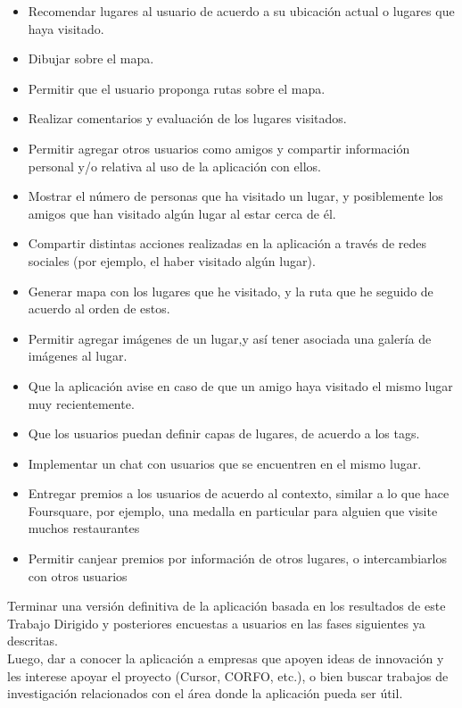 \documentclass[10pt,letterpaper]{article}
\begin{document}
\begin{itemize}
\item Recomendar lugares al usuario de acuerdo a su ubicación actual o lugares que haya visitado.
\item Dibujar sobre el mapa.
\item Permitir que el usuario proponga rutas sobre el mapa.
\item Realizar comentarios y evaluación de los lugares visitados.
\item Permitir agregar otros usuarios como amigos y compartir información personal y/o relativa al uso de la aplicación con ellos.
\item Mostrar el número de personas que ha visitado un lugar, y posiblemente los amigos que han visitado algún lugar al estar cerca de él.
\item Compartir distintas acciones realizadas en la aplicación a través de redes sociales (por ejemplo, el haber visitado algún lugar).
\item Generar mapa con los lugares que he visitado, y la ruta que he seguido de acuerdo al orden de estos.
\item Permitir agregar imágenes de un lugar,y así tener asociada una galería de imágenes al lugar.
\item Que la aplicación avise en caso de que un amigo haya visitado el mismo lugar muy recientemente.
\item Que los usuarios puedan definir capas de lugares, de acuerdo a los tags.
\item Implementar un chat con usuarios que se encuentren en el mismo lugar.
\item Entregar premios a los usuarios de acuerdo al contexto, similar a lo que hace Foursquare, por ejemplo, una medalla en particular para alguien que visite muchos restaurantes
\item Permitir canjear premios por información de otros lugares, o intercambiarlos con otros usuarios
\end{itemize}

Terminar una versión definitiva de la aplicación basada en los resultados de este Trabajo Dirigido y posteriores encuestas a usuarios en las fases siguientes ya descritas.\\

Luego, dar a conocer la aplicación a empresas que apoyen ideas de innovación y les interese apoyar el proyecto (Cursor, CORFO, etc.), o bien buscar trabajos de investigación relacionados con el área donde la aplicación pueda ser útil.\\
\end{document}
